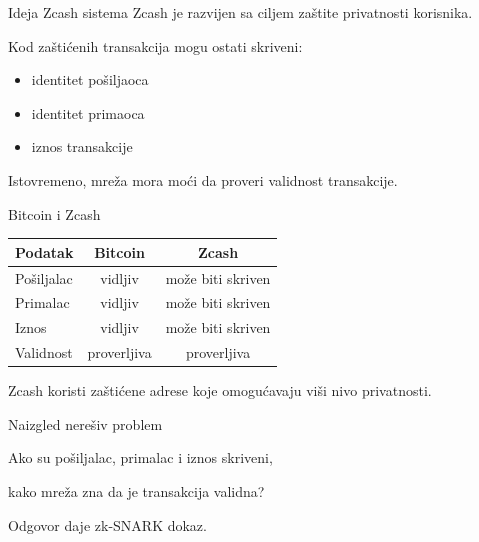 \documentclass[aspectratio=1610]{beamer}
\begin{document}
\begin{frame}{Ideja Zcash sistema}
Zcash je razvijen sa ciljem zaštite privatnosti korisnika.

\bigskip

Kod zaštićenih transakcija mogu ostati skriveni:

\begin{itemize}
    \item identitet pošiljaoca
    \item identitet primaoca
    \item iznos transakcije
\end{itemize}

\bigskip

Istovremeno, mreža mora moći da proveri validnost transakcije.
\end{frame}

\begin{frame}{Bitcoin i Zcash}

\begin{center}
\begin{tabular}{|l|c|c|}
\hline
\textbf{Podatak} & \textbf{Bitcoin} & \textbf{Zcash} \\
\hline
Pošiljalac & vidljiv & može biti skriven \\
\hline
Primalac & vidljiv & može biti skriven \\
\hline
Iznos & vidljiv & može biti skriven \\
\hline
Validnost & proverljiva & proverljiva \\
\hline
\end{tabular}
\end{center}

\bigskip

Zcash koristi zaštićene adrese koje omogućavaju viši nivo privatnosti.
\end{frame}

\begin{frame}{Naizgled nerešiv problem}

\begin{center}
\Large

Ako su pošiljalac, primalac i iznos skriveni,

\vspace{0.5cm}

kako mreža zna da je transakcija validna?

\end{center}

\vspace{0.5cm}

Odgovor daje zk-SNARK dokaz.
\end{frame}
\end{document}
